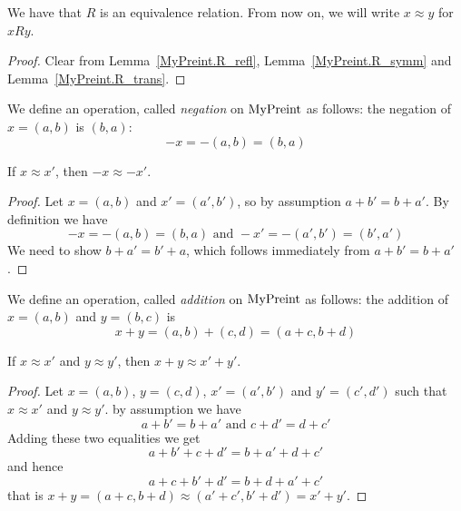 \begin{lemma}
    \label{MyPreint.R_equiv}
    \leanok
We have that $R$ is an equivalence relation. From now on, we will write $x \approx y$ for
$x R y$.
\end{lemma}
\begin{proof}
    \leanok
Clear from Lemma~\ref{MyPreint.R_refl}, Lemma~\ref{MyPreint.R_symm} and Lemma~\ref{MyPreint.R_trans}.
\end{proof}

\begin{definition}
    \label{MyPreint.neg}
    \leanok
We define an operation, called \emph{negation} on $\mathrm{MyPreint}$ as follows: the negation of $x = (a,b)$ is
$(b,a)$:
\[
-x = -(a,b) = (b,a)
\]
\end{definition}

\begin{lemma}
    \label{MyPreint.neg_quotient}
    \leanok
If $x \approx x'$, then $-x \approx -x'$.
\end{lemma}
\begin{proof}
\leanok
Let $x = (a,b)$ and $x' = (a',b')$, so by assumption $a + b' = b + a'$. By definition we have
\[
-x=-(a,b)=(b,a) \mbox{ and } -x'=-(a',b')=(b',a')
\]
We need to show $b+a'=b'+a$, which follows immediately from $a + b' = b + a'$.
\end{proof}

\begin{definition}
    \label{MyPreint.add}
    \leanok
We define an operation, called \emph{addition} on $\mathrm{MyPreint}$ as follows: the addition of $x = (a,b)$
and $y = (b, c)$ is
\[
x + y = (a,b) + (c,d) = (a+c, b + d)
\]
\end{definition}

\begin{lemma}
    \label{MyPreint.add_quotient}
    \leanok
If $x \approx x'$ and $y \approx y'$, then $x + y \approx x' + y'$.
\end{lemma}
\begin{proof}
\leanok
Let $x = (a,b)$, $y = (c,d)$, $x' = (a',b')$ and $y' = (c',d')$ such that $x \approx x'$ and $y \approx y'$. by assumption we have
\[
a + b' = b + a' \mbox{ and } c + d' = d + c'
\]
Adding these two equalities we get
\[
a+b'+c+d'=b+a'+d+c'
\]
and hence
\[
a+c+b'+d'=b+d+a'+c'
\]
that is $x + y = (a+c,b+d) \approx (a'+c',b'+d') = x'+y'$.
\end{proof}

